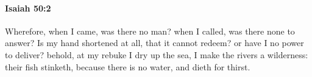 
		\paragraph{Isaiah 50:2} %
			\label{ISAIAH-50-2}

			Wherefore, when I came, was there no man? when I called, was there none to answer? Is my hand shortened at all, that it cannot redeem? or have I no power to deliver? behold, at my rebuke I dry up the sea, I make the rivers a wilderness: their fish stinketh, because there is no water, and dieth for thirst.


